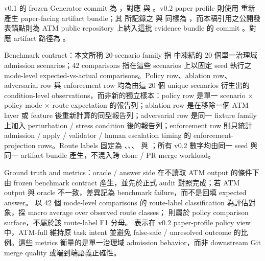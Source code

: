 \documentclass[a4paper,fontset=none]{ctexart}
\begin{document}
v0.1 的 frozen Generator commit 為 \texttt{}，對應 \texttt{} 與 \texttt{}。v0.2 paper profile 則使用 \texttt{} 重新產生 paper-facing artifact bundle；其 \texttt{} 所記錄之 \texttt{} 與 \texttt{} 同樣為 \texttt{}，而本稿引用之公開發表錨點則為 ATM public repository \texttt{} 上納入這批 evidence bundle 的 commit \texttt{}。對應 artifact 路徑為 \texttt{}。

Benchmark contract：本文所稱 20-scenario family 指 \texttt{} 中凍結的 20 個單一治理域 admission scenarios；42 comparisons 指在這些 scenarios 上以固定 seed \texttt{} 執行之 mode-level expected-vs-actual comparisons。Policy row、ablation row、adversarial row 與 enforcement row 均為由這 20 個 unique scenarios 衍生出的 condition-level observations，而非新的獨立樣本：policy row 是單一 scenario $\times$ policy mode $\times$ route expectation 的報告列；ablation row 是在移除一個 ATM layer 或 feature 後重新計算的同型報告列；adversarial row 是同一 fixture family 上加入 perturbation / stress condition 後的報告列；enforcement row 則只統計 admission / apply / validator / human escalation timing 的 enforcement-projection rows。Route labels 固定為 \texttt{}、\texttt{}、\texttt{}、\texttt{} 與 \texttt{}；所有 v0.2 數字均由同一 seed 與同一 artifact bundle 產生，不混入跨 clone / PR merge workload。

Ground truth and metrics：oracle / answer side 在不讀取 ATM output 的條件下由 frozen benchmark contract 產生，並先於正式 audit 對照完成；若 ATM output 與 oracle 不一致，差異記為 benchmark failure，而不是回填 expected answer。\texttt{} 以 42 個 mode-level comparisons 的 route-label classification 為評估對象，採 macro average over observed route classes；\texttt{} 則屬於 policy comparison surface，不屬於該 route-label F1 分母。\texttt{} 表示在 v0.2 paper-profile policy view 中，ATM-full 維持原 task intent 並避免 false-safe / unresolved outcome 的比例。這些 metrics 衡量的是單一治理域 admission behavior，而非 downstream Git merge quality 或端到端語義正確性。
\end{document}
